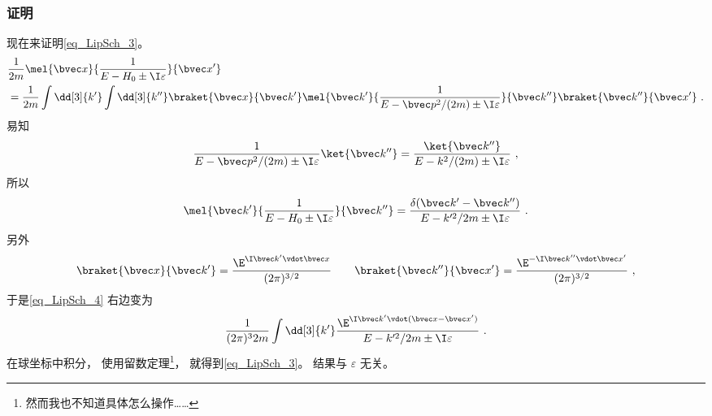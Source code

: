 \subsubsection{证明}
现在来证明\autoref{eq_LipSch_3}。
\begin{equation}\label{eq_LipSch_4}
\begin{aligned}
&\frac{1}{2m} \mel{\bvec x}{\frac{1}{E-H_0\pm \I\varepsilon}}{\bvec x'}\\
&= \frac{1}{2m} \int \dd[3]{k'} \int \dd[3]{k''} \braket{\bvec x}{\bvec k'}\mel{\bvec k'}{\frac{1}{E-\bvec p^2/(2m)\pm \I\varepsilon}}{\bvec k''} \braket{\bvec k''}{\bvec x'}~.
\end{aligned}
\end{equation}
易知
\begin{equation}
\frac{1}{E-\bvec p^2/(2m)\pm \I\varepsilon}\ket{\bvec k''} = \frac{\ket{\bvec k''}}{E- k^2/(2m)\pm \I\varepsilon}~,
\end{equation}
所以
\begin{equation}
\mel{\bvec k'}{\frac{1}{E-H_0\pm \I\varepsilon}}{\bvec k''} = \frac{\delta(\bvec k'-\bvec k'')}{E-k'^2/2m\pm\I\varepsilon}~.
\end{equation}
另外
\begin{equation}
\braket{\bvec x}{\bvec k'} = \frac{\E^{\I \bvec k'\vdot \bvec x}}{(2\pi)^{3/2}}
\qquad
\braket{\bvec k''}{\bvec x'} = \frac{\E^{-\I \bvec k''\vdot \bvec x'}}{(2\pi)^{3/2}}~,
\end{equation}
于是\autoref{eq_LipSch_4} 右边变为
\begin{equation}
\frac{1}{(2\pi)^32m}\int\dd[3]{k'}  \frac{\E^{\I \bvec k'\vdot (\bvec x-\bvec x')}}{E-k'^2/2m\pm\I\varepsilon}~.
\end{equation}
在球坐标中积分， 使用留数定理\footnote{然而我也不知道具体怎么操作……}， 就得到\autoref{eq_LipSch_3}。 结果与 $\varepsilon$ 无关。
